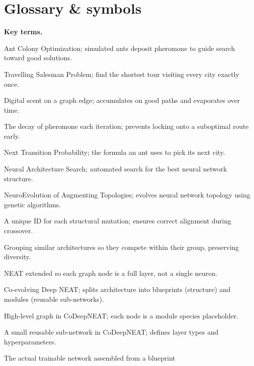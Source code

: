 \documentclass[a4paper,11pt]{article}
\begin{document}
\section*{Glossary \& symbols}

\noindent\textbf{Key terms.}
\begin{description}[leftmargin=9em,style=nextline,font=\normalfont\bfseries\color{navy}]
  \item[ACO] Ant Colony Optimization; simulated ants deposit pheromone
    to guide search toward good solutions.
  \item[TSP] Travelling Salesman Problem; find the shortest tour visiting
    every city exactly once.
  \item[pheromone] Digital scent on a graph edge; accumulates on good
    paths and evaporates over time.
  \item[evaporation] The decay of pheromone each iteration; prevents
    locking onto a suboptimal route early.
  \item[NTP] Next Transition Probability; the formula an ant uses to pick
    its next city.
  \item[NAS] Neural Architecture Search; automated search for the best
    neural network structure.
  \item[NEAT] NeuroEvolution of Augmenting Topologies; evolves neural
    network topology using genetic algorithms.
  \item[innovation number] A unique ID for each structural mutation;
    ensures correct alignment during crossover.
  \item[speciation] Grouping similar architectures so they compete within
    their group, preserving diversity.
  \item[DeepNEAT] NEAT extended so each graph node is a full layer,
    not a single neuron.
  \item[CoDeepNEAT] Co-evolving Deep NEAT; splits architecture into
    blueprints (structure) and modules (reusable sub-networks).
  \item[blueprint] High-level graph in CoDeepNEAT; each node is a module
    species placeholder.
  \item[module] A small reusable sub-network in CoDeepNEAT; defines layer
    types and hyperparameters.
  \item[phenotype] The actual trainable network assembled from a blueprint

\end{description}
\end{document}
